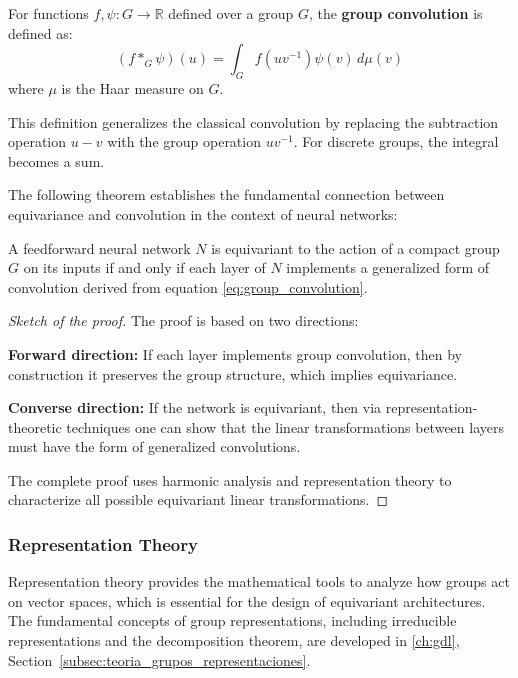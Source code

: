 \begin{definition}
For functions $f, \psi: G \to \mathbb{R}$ defined over a group $G$, the \textbf{group convolution} is defined as:
\begin{equation}
(f *_G \psi)(u) = \int_G f(uv^{-1}) \psi(v) \, d\mu(v)
\label{eq:group_convolution}
\end{equation}
where $\mu$ is the Haar measure on $G$.
\end{definition}

This definition generalizes the classical convolution by replacing the subtraction operation $u - v$ with the group operation $uv^{-1}$. For discrete groups, the integral becomes a sum.

The following theorem establishes the fundamental connection between equivariance and convolution in the context of neural networks:

\begin{theorem}
A feedforward neural network $N$ is equivariant to the action of a compact group $G$ on its inputs if and only if each layer of $N$ implements a generalized form of convolution derived from equation \ref{eq:group_convolution}.
\end{theorem}

\begin{proof}[Sketch of the proof]
The proof is based on two directions:

\textbf{Forward direction:} If each layer implements group convolution, then by construction it preserves the group structure, which implies equivariance.

\textbf{Converse direction:} If the network is equivariant, then via representation-theoretic techniques one can show that the linear transformations between layers must have the form of generalized convolutions.

The complete proof uses harmonic analysis and representation theory to characterize all possible equivariant linear transformations.
\end{proof}

\subsubsection{Representation Theory}

Representation theory provides the mathematical tools to analyze how groups act on vector spaces, which is essential for the design of equivariant architectures. The fundamental concepts of group representations, including irreducible representations and the decomposition theorem, are developed in \autoref{ch:gdl}, Section~\ref{subsec:teoria_grupos_representaciones}.

